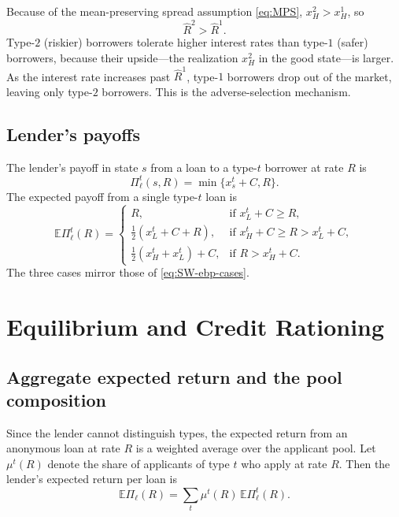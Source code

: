 \documentclass[11pt,a4paper,oneside]{book}
\def\E{\mathbb{E}}
\def\geq{\geqslant}
\theoremstyle{plain}
\theoremstyle{definition}
\theoremstyle{remark}
\numberwithin{equation}{chapter}
\begin{document}
Because of the mean-preserving spread assumption \eqref{eq:MPS}, $x^2_H > x^1_H$, so
\begin{equation}\label{eq:SW-ordering}
  \widehat{R}^2 > \widehat{R}^1.
\end{equation}
Type-$2$ (riskier) borrowers tolerate higher interest rates than type-$1$ (safer) borrowers, because their upside---the realization $x^2_H$ in the good state---is larger.
As the interest rate increases past $\widehat{R}^1$, type-$1$ borrowers drop out of the market, leaving only type-$2$ borrowers.
This is the adverse-selection mechanism.

\subsection{Lender's payoffs}

The lender's payoff in state $s$ from a loan to a type-$t$ borrower at rate $R$ is
\begin{equation}\label{eq:SW-lender}
  \Pi_\ell^t(s, R) = \min\{ x^t_s + C, R \}.
\end{equation}
The expected payoff from a single type-$t$ loan is
\begin{equation}\label{eq:SW-elp-cases}
  \E \Pi_\ell^t(R) = \begin{cases}
    R, & \text{if } x^t_L + C \geq R, \\
    \tfrac{1}{2}(x^t_L + C + R), & \text{if } x^t_H + C \geq R > x^t_L + C, \\
    \tfrac{1}{2}(x^t_H + x^t_L) + C, & \text{if } R > x^t_H + C.
  \end{cases}
\end{equation}
The three cases mirror those of \eqref{eq:SW-ebp-cases}.

\section{Equilibrium and Credit Rationing}
\label{sec:SW-rationing}

\subsection{Aggregate expected return and the pool composition}

Since the lender cannot distinguish types, the expected return from an anonymous loan at rate $R$ is a weighted average over the applicant pool.
Let $\mu^t(R)$ denote the share of applicants of type $t$ who apply at rate $R$.
Then the lender's expected return per loan is
\begin{equation}\label{eq:SW-aggregate-return}
  \E \Pi_\ell(R) = \sum_{t} \mu^t(R) \, \E \Pi_\ell^t(R).
\end{equation}
\end{document}
